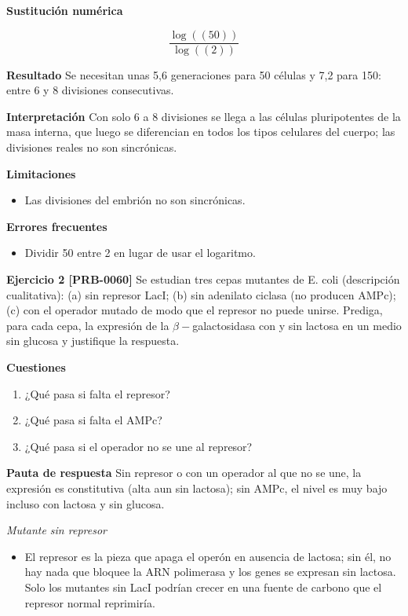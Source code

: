 \documentclass{book}
\begin{document}
\noindent\textbf{Sustitución numérica}

\[
\frac{\log{\left(\left(50\right) \right)}}{\log{\left(\left(2\right) \right)}}
\]

\noindent\textbf{Resultado}
Se necesitan unas 5,6 generaciones para 50 células y 7,2 para 150: entre 6 y 8 divisiones consecutivas.


\noindent\textbf{Interpretación}
Con solo 6 a 8 divisiones se llega a las células pluripotentes de la masa interna, que luego se diferencian en todos los tipos celulares del cuerpo; las divisiones reales no son sincrónicas.


\noindent\textbf{Limitaciones}
\begin{itemize}
\item Las divisiones del embrión no son sincrónicas.
\end{itemize}

\noindent\textbf{Errores frecuentes}
\begin{itemize}
\item Dividir 50 entre 2 en lugar de usar el logaritmo.
\end{itemize}

\noindent\textbf{Ejercicio 2 [PRB-0060]}
Se estudian tres cepas mutantes de E. coli (descripción cualitativa): (a) sin represor LacI; (b) sin adenilato ciclasa (no producen AMPc); (c) con el operador mutado de modo que el represor no puede unirse. Prediga, para cada cepa, la expresión de la \(\beta-\)galactosidasa con y sin lactosa en un medio sin glucosa y justifique la respuesta.


\noindent\textbf{Cuestiones}
\begin{enumerate}
\item ¿Qué pasa si falta el represor?
\item ¿Qué pasa si falta el AMPc?
\item ¿Qué pasa si el operador no se une al represor?
\end{enumerate}

\noindent\textbf{Pauta de respuesta}
Sin represor o con un operador al que no se une, la expresión es constitutiva (alta aun sin lactosa); sin AMPc, el nivel es muy bajo incluso con lactosa y sin glucosa.


\noindent\textit{Mutante sin represor}
\begin{itemize}
\item El represor es la pieza que apaga el operón en ausencia de lactosa; sin él, no hay nada que bloquee la ARN polimerasa y los genes se expresan sin lactosa. Solo los mutantes sin LacI podrían crecer en una fuente de carbono que el represor normal reprimiría.
\end{itemize}
\end{document}
